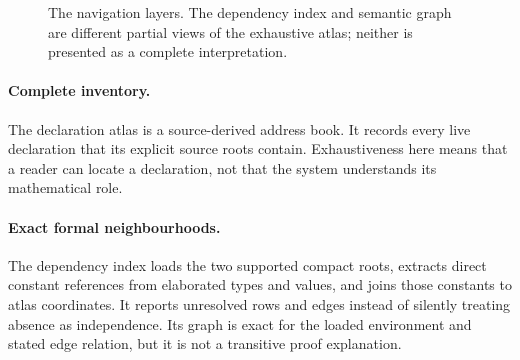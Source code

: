 \documentclass[11pt]{article}
\begin{document}
\begin{figure}[!t]
\caption{The navigation layers. The dependency index and semantic graph are
different partial views of the exhaustive atlas; neither is presented as a
complete interpretation.}
\label{fig:layers}
\end{figure}

\paragraph{Complete inventory.}
The declaration atlas is a source-derived address book. It records every live
declaration that its explicit source roots contain. Exhaustiveness here means
that a reader can locate a declaration, not that the system understands its
mathematical role.

\paragraph{Exact formal neighbourhoods.}
The dependency index loads the two supported compact roots, extracts direct
constant references from elaborated types and values, and joins those
constants to atlas coordinates. It reports unresolved rows and edges instead
of silently treating absence as independence. Its graph is exact for the
loaded environment and stated edge relation, but it is not a transitive proof
explanation.
\end{document}
